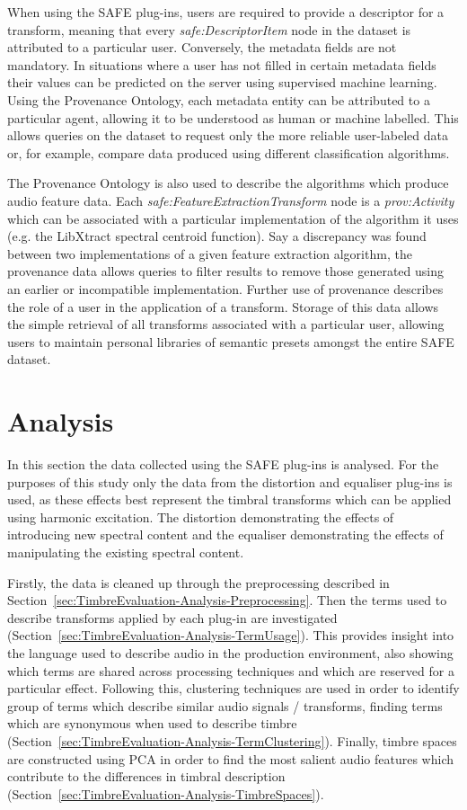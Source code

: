 		When using the SAFE plug-ins, users are required to provide a descriptor for a transform, meaning that
		every \emph{safe:DescriptorItem} node in the dataset is attributed to a particular user. Conversely, the
		metadata fields are not mandatory. In situations where a user has not filled in certain metadata fields
		their values can be predicted on the server using supervised machine learning. Using the Provenance
		Ontology, each metadata entity can be attributed to a particular agent, allowing it to be understood as
		human or machine labelled. This allows queries on the dataset to request only the more reliable
		user-labeled data or, for example, compare data produced using different classification algorithms.

		The Provenance Ontology is also used to describe the algorithms which produce audio feature data. Each
		\emph{safe:FeatureExtractionTransform} node is a \emph{prov:Activity} which can be associated with a
		particular implementation of the algorithm it uses (e.g. the LibXtract \citep{bullock2007libxtract}
		spectral centroid function). Say a discrepancy was found between two implementations of a given feature
		extraction algorithm, the provenance data allows queries to filter results to remove those generated using
		an earlier or incompatible implementation. Further use of provenance describes the role of a user in the
		application of a transform. Storage of this data allows the simple retrieval of all transforms associated
		with a particular user, allowing users to maintain personal libraries of semantic presets amongst the
		entire SAFE dataset.

\section{Analysis}
\label{sec:TimbreEvaluation-Analysis}
	In this section the data collected using the SAFE plug-ins is analysed. For the purposes of this study only the
	data from the distortion and equaliser plug-ins is used, as these effects best represent the timbral transforms
	which can be applied using harmonic excitation. The distortion demonstrating the effects of introducing new
	spectral content and the equaliser demonstrating the effects of manipulating the existing spectral content.

	Firstly, the data is cleaned up through the preprocessing described in
	Section~\ref{sec:TimbreEvaluation-Analysis-Preprocessing}. Then the terms used to describe transforms applied by
	each plug-in are investigated (Section~\ref{sec:TimbreEvaluation-Analysis-TermUsage}). This provides insight into
	the language used to describe audio in the production environment, also showing which terms are shared across
	processing techniques and which are reserved for a particular effect. Following this, clustering techniques are
	used in order to identify group of terms which describe similar audio signals / transforms, finding terms which are
	synonymous when used to describe timbre (Section~\ref{sec:TimbreEvaluation-Analysis-TermClustering}). Finally,
	timbre spaces are constructed using PCA in order to find the most salient audio features which contribute to the
	differences in timbral description (Section~\ref{sec:TimbreEvaluation-Analysis-TimbreSpaces}).

